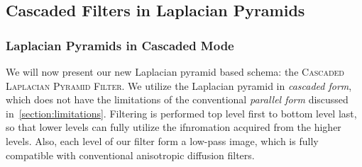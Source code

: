 \subsection{Cascaded Filters in Laplacian Pyramids}
\subsubsection{Laplacian Pyramids in Cascaded Mode}
We will now present our new Laplacian pyramid based schema: the \textsc{Cascaded Laplacian Pyramid Filter}.
We utilize the Laplacian pyramid in \textit{cascaded form}, which does not have the limitations of the conventional \textit{parallel form} discussed in~\cref{section:limitations}.
Filtering is performed top level first to bottom level last, so that lower levels can fully utilize the ifnromation acquired from the higher levels.
Also, each level of our filter form a low-pass image, which is fully compatible with conventional anisotropic diffusion filters.

